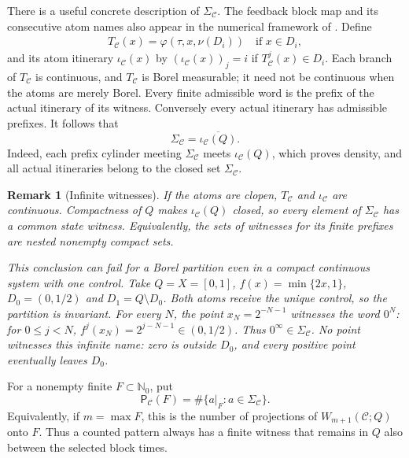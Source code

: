 \documentclass[11pt,reqno]{amsart}
\numberwithin{equation}{section}
\newtheorem{remark}[theorem]{Remark}
\theoremstyle{definition}
\newcommand{\Nzero}{\mathbb N_0}
\newcommand{\C}{\mathcal C}
\newcommand{\Patt}{\mathsf P}
\begin{document}
There is a useful concrete description of $\Sigma_\C$. The feedback
block map and its consecutive atom names also appear in the numerical
framework of \cite[Section~2]{TomarKawanZamani2022}. Define
\begin{align*}
 T_\C(x)=\varphi(\tau,x,\nu(D_i))\quad\text{if }x\in D_i,
\end{align*}
and its atom itinerary $\iota_\C(x)$ by
$(\iota_\C(x))_j=i$ if $T_\C^j(x)\in D_i$.
Each branch of $T_\C$ is continuous, and $T_\C$ is Borel measurable;
it need not be continuous when the atoms are merely Borel. Every finite
admissible word is the prefix of the actual itinerary of its witness.
Conversely every actual itinerary has admissible prefixes. It follows that
\begin{equation}\label{eq:itinerary-closure}
 \Sigma_\C=\overline{\iota_\C(Q)}.
\end{equation}
Indeed, each prefix cylinder meeting $\Sigma_\C$ meets
$\iota_\C(Q)$, which proves density, and all actual itineraries belong
to the closed set $\Sigma_\C$.

\begin{remark}[Infinite witnesses]\label{rem:witness}
If the atoms are clopen, $T_\C$ and $\iota_\C$ are continuous.
Compactness of $Q$ makes $\iota_\C(Q)$ closed, so every element of
$\Sigma_\C$ has a common state witness. Equivalently, the sets of witnesses
for its finite prefixes are nested nonempty compact sets.

This conclusion can fail for a Borel partition even in a compact
continuous system with one control. Take $Q=X=[0,1]$,
$f(x)=\min\{2x,1\}$, $D_0=(0,1/2)$ and $D_1=Q\setminus D_0$.
Both atoms receive the unique control, so the partition is invariant.
For every $N$, the point $x_N=2^{-N-1}$ witnesses the word $0^N$:
for $0\le j<N$, $f^j(x_N)=2^{j-N-1}\in(0,1/2)$.
Thus $0^\infty\in\Sigma_\C$. No point witnesses this infinite name:
zero is outside $D_0$, and every positive point eventually leaves $D_0$.
\end{remark}

For a nonempty finite $F\subset\Nzero$, put
\begin{equation}\label{eq:control-pattern-count}
 \Patt_\C(F)=\#\{a|_F:a\in\Sigma_\C\}.
\end{equation}
Equivalently, if $m=\max F$, this is the number of projections of
$W_{m+1}(\C;Q)$ onto $F$.  Thus a counted pattern always has a finite witness
that remains in $Q$ also between the selected block times.
\end{document}
